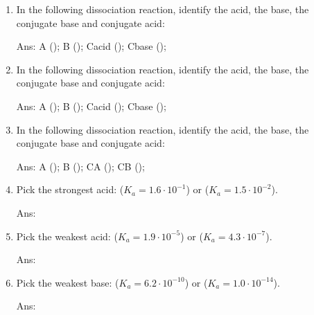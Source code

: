 \documentclass[main.tex]{subfiles}
\begin{document}
\begin{multicols*}{2}
\begin{enumerate}
\item In the following dissociation reaction, identify the acid, the base, the conjugate base and conjugate acid:
\begin{center}\end{center}
\begin{flushright}\small Ans: A (); B (); Cacid (); Cbase ();  \end{flushright}

\item In the following dissociation reaction, identify the acid, the base, the conjugate base and conjugate acid:
\begin{center}\end{center}
\begin{flushright}\small Ans: A (); B (); Cacid (); Cbase ();  \end{flushright}

\item In the following dissociation reaction, identify the acid, the base, the conjugate base and conjugate acid:
\begin{center}\end{center}
\begin{flushright}\small Ans: A (); B (); CA (); CB ();  \end{flushright}






\item Pick the strongest acid:  ($K_a=1.6\cdot 10^{-1}$) or  ($K_a=1.5\cdot 10^{-2}$).
\begin{flushright}\small Ans:   \end{flushright}

\item Pick the weakest acid:  ($K_a=1.9\cdot 10^{-5}$) or  ($K_a=4.3\cdot 10^{-7}$).
\begin{flushright}\small Ans:   \end{flushright}

\item Pick the weakest base:  ($K_a=6.2\cdot 10^{-10}$) or  ($K_a=1.0\cdot 10^{-14}$).
\begin{flushright}\small Ans:   \end{flushright}



\end{enumerate}
\end{multicols*}
\end{document}
